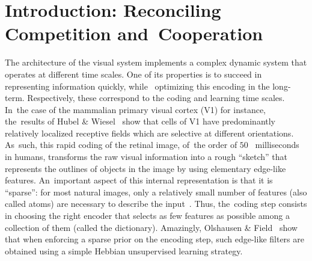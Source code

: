 \documentclass[vision,article,accept,oneauthor,pdftex]{Definitions/mdpi}
\newcommand{\seeFig}[1]{Figure~\ref{fig:#1}}%
\begin{document}
\section{Introduction: Reconciling Competition and~Cooperation}\label{introduction}
The architecture of the visual system implements a complex dynamic system that operates at different time scales. One of its properties is to succeed in representing information quickly, while~ optimizing this encoding in the long-term. Respectively, these correspond to the coding and learning time scales. In~the case of the mammalian primary visual cortex (V1) for instance, the~results of Hubel \& Wiesel~\cite{Hubel68} show that cells of V1 have predominantly relatively localized receptive fields which are selective at different orientations. As~such, this rapid coding of the retinal image, of~the order of $50$~ milliseconds in humans, transforms the raw visual information into a rough ``sketch'' that represents the outlines of objects in the image by using elementary edge-like features. An~important aspect of this internal representation is that it is ``sparse'': for most natural images, only a relatively small number of features (also called atoms) are necessary to describe the input~\cite{Perrinet15sparse}. Thus, the~coding step consists in choosing the right encoder that selects as few features as possible among a collection of them (called the dictionary). Amazingly, Olshausen \& Field~\cite{Olshausen96} show that when enforcing a sparse prior on the encoding step, such edge-like filters are obtained using a simple Hebbian unsupervised learning strategy. %
\end{document}
